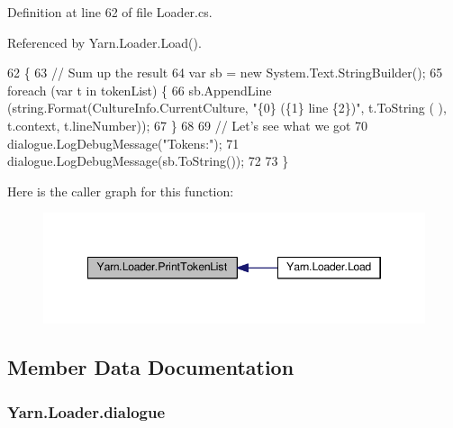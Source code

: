 Definition at line 62 of file Loader.\-cs.



Referenced by Yarn.\-Loader.\-Load().


\begin{DoxyCode}
62                                                           \{
63             \textcolor{comment}{// Sum up the result}
64             var sb = \textcolor{keyword}{new} System.Text.StringBuilder();
65             \textcolor{keywordflow}{foreach} (var t \textcolor{keywordflow}{in} tokenList) \{
66                 sb.AppendLine (string.Format(CultureInfo.CurrentCulture, \textcolor{stringliteral}{"\{0\} (\{1\} line \{2\})"}, t.ToString (
      ), t.context, t.lineNumber));
67             \}
68 
69             \textcolor{comment}{// Let's see what we got}
70             dialogue.LogDebugMessage(\textcolor{stringliteral}{"Tokens:"});
71             dialogue.LogDebugMessage(sb.ToString());
72 
73         \}
\end{DoxyCode}


Here is the caller graph for this function\-:
\nopagebreak
\begin{figure}[H]
\begin{center}
\leavevmode
\includegraphics[width=346pt]{a00135_a9321fce224021841ce6f70ca7fbe531b_icgraph}
\end{center}
\end{figure}




\subsection{Member Data Documentation}
\hypertarget{a00135_a89d1f29eba1c52c96c62a4cfe7859a1d}{
\subsubsection[{dialogue}]{ Yarn.\-Loader.\-dialogue\hspace{0.3cm}{\ttfamily [private]}}}\label{a00135_a89d1f29eba1c52c96c62a4cfe7859a1d}


